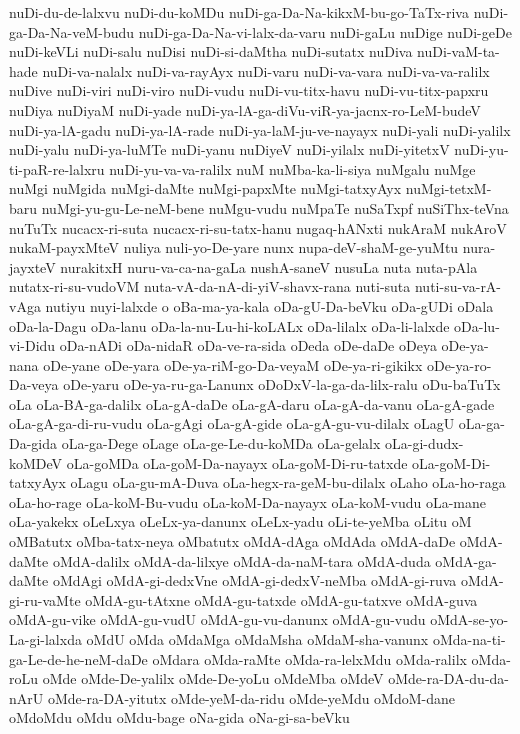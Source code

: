 {nuDi-du-de-lalxvu
nuDi-du-koMDu
nuDi-ga-Da-Na-kikxM-bu-go-TaTx-riva
nuDi-ga-Da-Na-veM-budu
nuDi-ga-Da-Na-vi-lalx-da-varu
nuDi-gaLu
nuDige
nuDi-geDe
nuDi-keVLi
nuDi-salu
nuDisi
nuDi-si-daMtha
nuDi-sutatx
nuDiva
nuDi-vaM-ta-hade
nuDi-va-nalalx
nuDi-va-rayAyx
nuDi-varu
nuDi-va-vara
nuDi-va-va-ralilx
nuDive
nuDi-viri
nuDi-viro
nuDi-vudu
nuDi-vu-titx-havu
nuDi-vu-titx-papxru
nuDiya
nuDiyaM
nuDi-yade
nuDi-ya-lA-ga-diVu-viR-ya-jacnx-ro-LeM-budeV
nuDi-ya-lA-gadu
nuDi-ya-lA-rade
nuDi-ya-laM-ju-ve-nayayx
nuDi-yali
nuDi-yalilx
nuDi-yalu
nuDi-ya-luMTe
nuDi-yanu
nuDiyeV
nuDi-yilalx
nuDi-yitetxV
nuDi-yu-ti-paR-re-lalxru
nuDi-yu-va-va-ralilx
nuM
nuMba-ka-li-siya
nuMgalu
nuMge
nuMgi
nuMgida
nuMgi-daMte
nuMgi-papxMte
nuMgi-tatxyAyx
nuMgi-tetxM-baru
nuMgi-yu-gu-Le-neM-bene
nuMgu-vudu
nuMpaTe
nuSaTxpf
nuSiThx-teVna
nuTuTx
nucacx-ri-suta
nucacx-ri-su-tatx-hanu
nugaq-hANxti
nukAraM
nukAroV
nukaM-payxMteV
nuliya
nuli-yo-De-yare
nunx
nupa-deV-shaM-ge-yuMtu
nura-jayxteV
nurakitxH
nuru-va-ca-na-gaLa
nushA-saneV
nusuLa
nuta
nuta-pAla
nutatx-ri-su-vudoVM
nuta-vA-da-nA-di-yiV-shavx-rana
nuti-suta
nuti-su-va-rA-vAga
nutiyu
nuyi-lalxde
o
oBa-ma-ya-kala
oDa-gU-Da-beVku
oDa-gUDi
oDala
oDa-la-Dagu
oDa-lanu
oDa-la-nu-Lu-hi-koLALx
oDa-lilalx
oDa-li-lalxde
oDa-lu-vi-Didu
oDa-nADi
oDa-nidaR
oDa-ve-ra-sida
oDeda
oDe-daDe
oDeya
oDe-ya-nana
oDe-yane
oDe-yara
oDe-ya-riM-go-Da-veyaM
oDe-ya-ri-gikikx
oDe-ya-ro-Da-veya
oDe-yaru
oDe-ya-ru-ga-Lanunx
oDoDxV-la-ga-da-lilx-ralu
oDu-baTuTx
oLa
oLa-BA-ga-dalilx
oLa-gA-daDe
oLa-gA-daru
oLa-gA-da-vanu
oLa-gA-gade
oLa-gA-ga-di-ru-vudu
oLa-gAgi
oLa-gA-gide
oLa-gA-gu-vu-dilalx
oLagU
oLa-ga-Da-gida
oLa-ga-Dege
oLage
oLa-ge-Le-du-koMDa
oLa-gelalx
oLa-gi-dudx-koMDeV
oLa-goMDa
oLa-goM-Da-nayayx
oLa-goM-Di-ru-tatxde
oLa-goM-Di-tatxyAyx
oLagu
oLa-gu-mA-Duva
oLa-hegx-ra-geM-bu-dilalx
oLaho
oLa-ho-raga
oLa-ho-rage
oLa-koM-Bu-vudu
oLa-koM-Da-nayayx
oLa-koM-vudu
oLa-mane
oLa-yakekx
oLeLxya
oLeLx-ya-danunx
oLeLx-yadu
oLi-te-yeMba
oLitu
oM
oMBatutx
oMba-tatx-neya
oMbatutx
oMdA-dAga
oMdAda
oMdA-daDe
oMdA-daMte
oMdA-dalilx
oMdA-da-lilxye
oMdA-da-naM-tara
oMdA-duda
oMdA-ga-daMte
oMdAgi
oMdA-gi-dedxVne
oMdA-gi-dedxV-neMba
oMdA-gi-ruva
oMdA-gi-ru-vaMte
oMdA-gu-tAtxne
oMdA-gu-tatxde
oMdA-gu-tatxve
oMdA-guva
oMdA-gu-vike
oMdA-gu-vudU
oMdA-gu-vu-danunx
oMdA-gu-vudu
oMdA-se-yo-La-gi-lalxda
oMdU
oMda
oMdaMga
oMdaMsha
oMdaM-sha-vanunx
oMda-na-ti-ga-Le-de-he-neM-daDe
oMdara
oMda-raMte
oMda-ra-lelxMdu
oMda-ralilx
oMda-roLu
oMde
oMde-De-yalilx
oMde-De-yoLu
oMdeMba
oMdeV
oMde-ra-DA-du-da-nArU
oMde-ra-DA-yitutx
oMde-yeM-da-ridu
oMde-yeMdu
oMdoM-dane
oMdoMdu
oMdu
oMdu-bage
oNa-gida
oNa-gi-sa-beVku
}

